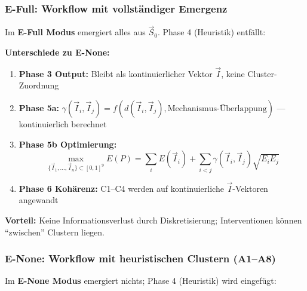 \subsubsection{E-Full: Workflow mit vollständiger Emergenz}

Im \textbf{E-Full Modus} emergiert alles aus $\vec{S}_0$. Phase 4 (Heuristik) entfällt:

\begin{center}
\footnotesize
{}
\end{center}

\textbf{Unterschiede zu E-None:}
\begin{enumerate}[nosep]
\item \textbf{Phase 3 Output:} Bleibt als kontinuierlicher Vektor $\vec{I}$, keine Cluster-Zuordnung
\item \textbf{Phase 5a:} $\gamma(\vec{I}_i, \vec{I}_j) = f(d(\vec{I}_i, \vec{I}_j), \text{Mechanismus-Überlappung})$ --- kontinuierlich berechnet
\item \textbf{Phase 5b Optimierung:}
    \begin{equation}
    \max_{\{\vec{I}_1, ..., \vec{I}_n\} \subset [0,1]^9} E(P) = \sum_{i} E(\vec{I}_i) + \sum_{i<j} \gamma(\vec{I}_i, \vec{I}_j) \sqrt{E_i E_j}
    \end{equation}
\item \textbf{Phase 6 Kohärenz:} C1--C4 werden auf kontinuierliche $\vec{I}$-Vektoren angewandt
\end{enumerate}

\textbf{Vorteil:} Keine Informationsverlust durch Diskretisierung; Interventionen können ``zwischen'' Clustern liegen.

\subsubsection{E-None: Workflow mit heuristischen Clustern (A1--A8)}

Im \textbf{E-None Modus} emergiert nichts; Phase 4 (Heuristik) wird eingefügt:

\begin{center}
\footnotesize
{}
\end{center}

